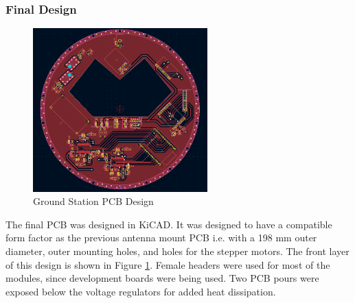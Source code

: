 \subsubsection{Final Design}
\begin{figure}[!htb]
  \centering
  \includegraphics[width=0.6\textwidth]{gs_pcb_design}
  \caption{Ground Station PCB Design}
  \label{fig:gs_pcb}
\end{figure}
The final PCB was designed in KiCAD. It was designed to have a compatible form factor as the previous antenna mount PCB i.e. with a 198 mm outer diameter, outer mounting holes, and holes for the stepper motors. The front layer of this design is shown in Figure \ref{fig:gs_pcb}. Female headers were used for most of the modules, since development boards were being used. Two PCB pours were exposed below the voltage regulators for added heat dissipation.